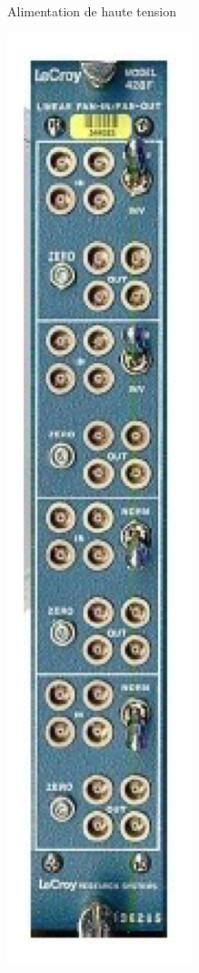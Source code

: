 \begin{figure}
\begin{subfigure}[t]{0.2\textwidth}
        \caption{Alimentation de haute tension}
        \label{fig:HV2}
    \end{subfigure}
    \hfill
    \begin{subfigure}[t]{0.2\textwidth}
        \includegraphics[height=0.25\textheight, width=\textwidth, keepaspectratio]{figures/FanInFanOut.png}

\end{subfigure}
\end{figure}
